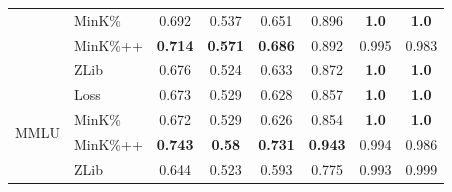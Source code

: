 \begin{table}[tb]
\begin{tabular}{clcccccc}
                                    & MinK\%                                                      &   0.692       &   0.537      &  0.651       &   0.896       &   \textbf{1.0}       &  \textbf{1.0}           \\  
                                    & MinK\%++                                                    &   \textbf{0.714}       &   \textbf{0.571}      &  \textbf{0.686}       &   0.892       &   0.995       &  0.983           \\  
                                    & ZLib                                                        &   0.676       &   0.524      &  0.633       &   0.872       &   \textbf{1.0}       &  \textbf{1.0}           \\
\midrule
\multirow{4}{*}{MMLU}                & Loss                                                        &   0.673       &   0.529      &  0.628       &   0.857       &   \textbf{1.0}       &  \textbf{1.0}           \\  
                                    & MinK\%                                                      &   0.672       &   0.529      &  0.626       &   0.854       &   \textbf{1.0}       &  \textbf{1.0}           \\  
                                    & MinK\%++                                                    &   \textbf{0.743}       &   \textbf{0.58}      &  \textbf{0.731}       &   \textbf{0.943}       &   0.994       &  0.986           \\  
                                    & ZLib                                                        &   0.644       &   0.523      &  0.593       &   0.775       &   0.993       &  0.999           \\
\bottomrule
\end{tabular}
\end{table}
